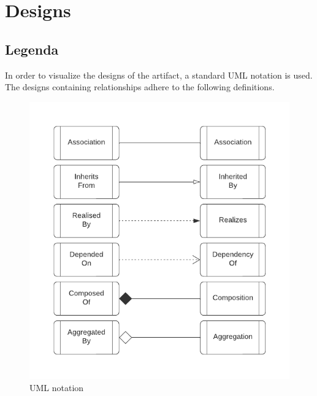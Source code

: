 \chapter{Designs} \label{appendix_designs} 

\section{Legenda} \label{appendix_legenda} 

In order to visualize the designs of the artifact, a standard UML notation is used. The
designs containing relationships adhere to the following definitions.

\begin{figure}[H]
  \centering
  \includegraphics[width=1\textwidth]{Figures/class_diagram_legenda.pdf}
  \caption[Generic architecture]{UML notation}
  \label{fi:class_diagram_relationship_notation}
\end{figure}

